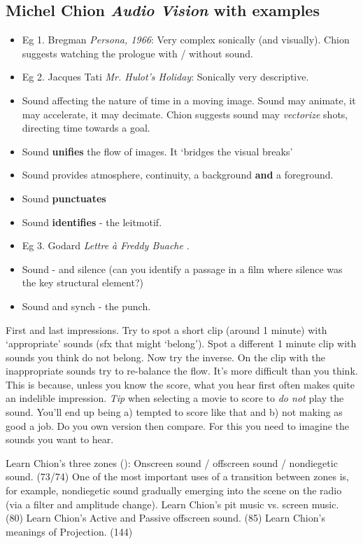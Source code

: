 \subsection{Michel Chion \textit{Audio Vision} with examples}
\begin{itemize}
\item Eg 1. Bregman \textit{Persona, 1966}: Very complex sonically (and visually). Chion suggests watching the prologue with / without sound. 
\item Eg 2. Jacques Tati \textit{Mr. Hulot's Holiday}: Sonically very descriptive. 
\item Sound affecting the nature of time in a moving image. Sound may animate, it may accelerate, it may decimate. Chion suggests sound may \textit{vectorize} shots, directing time towards a goal.
\item Sound \textbf{unifies} the flow of images. It `bridges the visual breaks' \citep[p.47]{chion1990} 
\item Sound provides atmosphere, continuity, a background \textbf{and} a foreground. 
\item Sound \textbf{punctuates}
\item Sound \textbf{identifies} - the leitmotif.
\item Eg 3. Godard \textit{Lettre \`a Freddy Buache} \citep[p.56]{chion1990}. 
\item Sound - and silence (can you identify a passage in a film where silence was the key structural element?)
\item Sound and synch - the punch. 
\end{itemize}

First and last impressions. Try to spot a short clip (around 1 minute) with `appropriate' sounds (sfx that might `belong'). Spot a different 1 minute clip with sounds you think do not belong. Now try the inverse. On the clip with the inappropriate sounds try to re-balance the flow. It's more difficult than you think. This is because, unless you know the score, what you hear first often makes quite an indelible impression. \textit{Tip} when selecting a movie to score to \textit{do not} play the sound. You'll end up being a) tempted to score like that and b) not making as good a job. Do you own version then compare. For this you need to imagine the sounds you want to hear. 

Learn Chion's three zones (\citep[p.73]{chion1990}): Onscreen sound / offscreen sound / nondiegetic sound. (73/74)
One of the most important uses of a transition between zones is, for example, nondiegetic sound gradually emerging into the scene on the radio (via a filter and amplitude change). 
Learn Chion's pit music vs. screen music. (80)
Learn Chion's Active and Passive offscreen sound. (85) 
Learn Chion's meanings of Projection. (144) 

